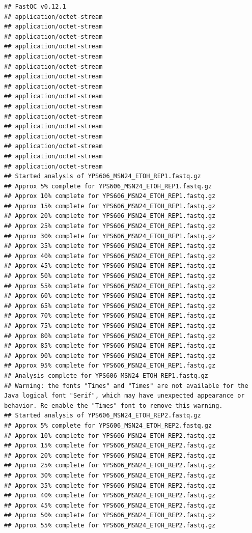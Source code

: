 \documentclass[
]{book}
\begin{document}
\begin{verbatim}
## FastQC v0.12.1
## application/octet-stream
## application/octet-stream
## application/octet-stream
## application/octet-stream
## application/octet-stream
## application/octet-stream
## application/octet-stream
## application/octet-stream
## application/octet-stream
## application/octet-stream
## application/octet-stream
## application/octet-stream
## application/octet-stream
## application/octet-stream
## application/octet-stream
## application/octet-stream
## Started analysis of YPS606_MSN24_ETOH_REP1.fastq.gz
## Approx 5% complete for YPS606_MSN24_ETOH_REP1.fastq.gz
## Approx 10% complete for YPS606_MSN24_ETOH_REP1.fastq.gz
## Approx 15% complete for YPS606_MSN24_ETOH_REP1.fastq.gz
## Approx 20% complete for YPS606_MSN24_ETOH_REP1.fastq.gz
## Approx 25% complete for YPS606_MSN24_ETOH_REP1.fastq.gz
## Approx 30% complete for YPS606_MSN24_ETOH_REP1.fastq.gz
## Approx 35% complete for YPS606_MSN24_ETOH_REP1.fastq.gz
## Approx 40% complete for YPS606_MSN24_ETOH_REP1.fastq.gz
## Approx 45% complete for YPS606_MSN24_ETOH_REP1.fastq.gz
## Approx 50% complete for YPS606_MSN24_ETOH_REP1.fastq.gz
## Approx 55% complete for YPS606_MSN24_ETOH_REP1.fastq.gz
## Approx 60% complete for YPS606_MSN24_ETOH_REP1.fastq.gz
## Approx 65% complete for YPS606_MSN24_ETOH_REP1.fastq.gz
## Approx 70% complete for YPS606_MSN24_ETOH_REP1.fastq.gz
## Approx 75% complete for YPS606_MSN24_ETOH_REP1.fastq.gz
## Approx 80% complete for YPS606_MSN24_ETOH_REP1.fastq.gz
## Approx 85% complete for YPS606_MSN24_ETOH_REP1.fastq.gz
## Approx 90% complete for YPS606_MSN24_ETOH_REP1.fastq.gz
## Approx 95% complete for YPS606_MSN24_ETOH_REP1.fastq.gz
## Analysis complete for YPS606_MSN24_ETOH_REP1.fastq.gz
## Warning: the fonts "Times" and "Times" are not available for the Java logical font "Serif", which may have unexpected appearance or behavior. Re-enable the "Times" font to remove this warning.
## Started analysis of YPS606_MSN24_ETOH_REP2.fastq.gz
## Approx 5% complete for YPS606_MSN24_ETOH_REP2.fastq.gz
## Approx 10% complete for YPS606_MSN24_ETOH_REP2.fastq.gz
## Approx 15% complete for YPS606_MSN24_ETOH_REP2.fastq.gz
## Approx 20% complete for YPS606_MSN24_ETOH_REP2.fastq.gz
## Approx 25% complete for YPS606_MSN24_ETOH_REP2.fastq.gz
## Approx 30% complete for YPS606_MSN24_ETOH_REP2.fastq.gz
## Approx 35% complete for YPS606_MSN24_ETOH_REP2.fastq.gz
## Approx 40% complete for YPS606_MSN24_ETOH_REP2.fastq.gz
## Approx 45% complete for YPS606_MSN24_ETOH_REP2.fastq.gz
## Approx 50% complete for YPS606_MSN24_ETOH_REP2.fastq.gz
## Approx 55% complete for YPS606_MSN24_ETOH_REP2.fastq.gz

\end{verbatim}
\end{document}
